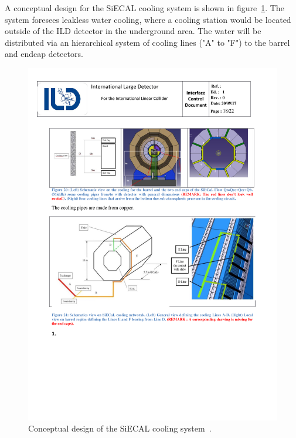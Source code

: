 A conceptual design for the SiECAL cooling system is shown in figure~\ref{ILD:fig:siecal_cooling}. The system foresees leakless water cooling, where a cooling station would be located outside of the ILD detector in the underground area. The water will be distributed via an hierarchical system of cooling lines ("A" to "F") to the barrel and endcap detectors.

\begin{figure}[h!]
    \centering
        \includegraphics[width=0.8\hsize]{Integration/fig/SiECAL_Cooling.pdf}
    \caption{Conceptual design of the SiECAL cooling system~\cite{ild:bib:SiECAL_ICD}.}
    \label{ILD:fig:siecal_cooling}
\end{figure}

